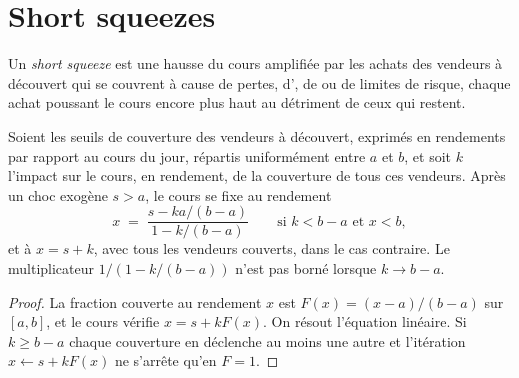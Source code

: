 \section{Short squeezes}

\begin{definition}\label{def:m1:stock-loan-and-short-selling:squeeze}
Un \emph{short squeeze} est une hausse du cours amplifiée par
les achats des vendeurs à découvert qui se couvrent à cause de pertes, d',
de  ou de limites de risque, chaque achat poussant le cours encore plus haut
au détriment de ceux qui restent.
\end{definition}

\begin{proposition}\label{prop:m1:stock-loan-and-short-selling:cascade}
Soient les seuils de couverture des vendeurs à découvert, exprimés en rendements par rapport
au cours du jour, répartis uniformément entre $a$ et $b$, et soit $k$ l'impact sur le cours, en
rendement, de la couverture de tous ces vendeurs. Après un choc exogène $s > a$, le cours
se fixe au rendement
\[
x \;=\; \frac{s - ka/(b-a)}{1 - k/(b-a)} \qquad\text{si } k < b-a \text{ et } x < b,
\]
et à $x = s + k$, avec tous les vendeurs couverts, dans le cas contraire. Le multiplicateur
$1/(1-k/(b-a))$ n'est pas borné lorsque $k \to b-a$.
\end{proposition}
\begin{proof}
La fraction couverte au rendement $x$ est $F(x) = (x-a)/(b-a)$ sur $[a,b]$, et le
cours vérifie $x = s + kF(x)$. On résout l'équation linéaire. Si $k \ge b-a$
chaque couverture en déclenche au moins une autre et l'itération $x \leftarrow s +
kF(x)$ ne s'arrête qu'en $F = 1$.
\end{proof}

